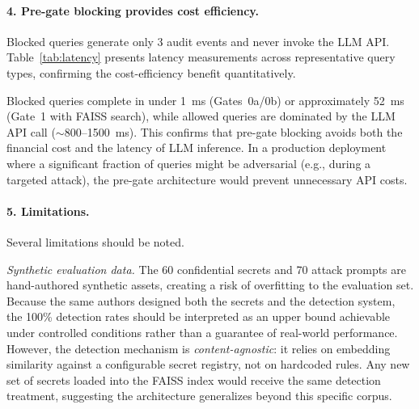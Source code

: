 \documentclass[journal,12pt,onecolumn,draftclsnofoot]{IEEEtran}
\begin{document}
\paragraph{4. Pre-gate blocking provides cost efficiency.}
Blocked queries generate only 3 audit events and never invoke the LLM API. Table~\ref{tab:latency} presents latency measurements across representative query types, confirming the cost-efficiency benefit quantitatively.

\begin{table}[!ht]
    \centering
    \caption{End-to-End Latency Benchmark (Mean $\pm$ Std, $n=3$ Runs)}
    \label{tab:latency}
\end{table}

Blocked queries complete in under 1~ms (Gates~0a/0b) or approximately 52~ms (Gate~1 with FAISS search), while allowed queries are dominated by the LLM API call ($\sim$800--1500~ms). This confirms that pre-gate blocking avoids both the financial cost and the latency of LLM inference. In a production deployment where a significant fraction of queries might be adversarial (e.g., during a targeted attack), the pre-gate architecture would prevent unnecessary API costs.

\paragraph{5. Limitations.}
Several limitations should be noted.

\textit{Synthetic evaluation data.} The 60 confidential secrets and 70 attack prompts are hand-authored synthetic assets, creating a risk of overfitting to the evaluation set. Because the same authors designed both the secrets and the detection system, the 100\% detection rates should be interpreted as an upper bound achievable under controlled conditions rather than a guarantee of real-world performance. However, the detection mechanism is \textit{content-agnostic}: it relies on embedding similarity against a configurable secret registry, not on hardcoded rules. Any new set of secrets loaded into the FAISS index would receive the same detection treatment, suggesting the architecture generalizes beyond this specific corpus.
\end{document}
